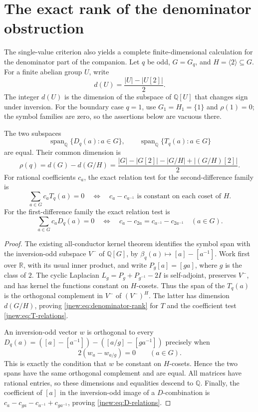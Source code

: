 \section{The exact rank of the denominator obstruction}
\label{jnew:sec:rank}

The single-value criterion also yields a complete finite-dimensional
calculation for the denominator part of the companion. Let $q$ be odd,
$G=G_q$, and $H=\langle2\rangle\subseteq G$. For a finite abelian
group $U$, write
\[
 d(U)=\frac{|U|-|U[2]|}{2}.
\]
The integer $d(U)$ is the dimension of the subspace of
$\mathbb Q[U]$ that changes sign under inversion.
For the boundary case $q=1$, use $G_1=H_1=\{1\}$ and $\rho(1)=0$;
the symbol families are zero, so the assertions below are vacuous there.

\begin{theorem}
\label{jnew:thm:denominator-rank}
The two subspaces
\[
 \operatorname{span}_{\mathbb Q}\{D_q(a):a\in G\},
 \qquad
 \operatorname{span}_{\mathbb Q}\{T_q(a):a\in G\}
\]
are equal. Their common dimension is
\begin{equation}\label{jnew:eq:denominator-rank}
 \boxed{\displaystyle\rho(q)=d(G)-d(G/H)
 =\frac{|G|-|G[2]|-|G/H|+|(G/H)[2]|}{2}.}
\end{equation}
For rational coefficients $c_a$, the exact relation test for the
second-difference family is
\begin{equation}\label{jnew:eq:T-relations}
 \sum_{a\in G}c_aT_q(a)=0
 \quad\Longleftrightarrow\quad
 c_a-c_{a^{-1}}\text{ is constant on each coset of }H.
\end{equation}
For the first-difference family the exact relation test is
\begin{equation}\label{jnew:eq:D-relations}
 \sum_{a\in G}c_aD_q(a)=0
 \quad\Longleftrightarrow\quad
 c_a-c_{2a}=c_{a^{-1}}-c_{2a^{-1}}\quad(a\in G).
\end{equation}
\end{theorem}
\begin{proof}
The existing all-conductor kernel theorem identifies the symbol span
with the inversion-odd subspace $V^-$ of $\mathbb Q[G]$, by
$\beta_q(a)\mapsto[a]-[a^{-1}]$. Work first over $\mathbb R$, with
its usual inner product, and write $P_g[a]=[ga]$, where $g$ is the
class of $2$. The cyclic Laplacian
$L_g=P_g+P_{g^{-1}}-2I$ is self-adjoint, preserves $V^-$, and has
kernel the functions constant on $H$-cosets. Thus the span of the
$T_q(a)$ is the orthogonal complement in $V^-$ of
$(V^-)^H$. The latter has dimension $d(G/H)$, proving
\eqref{jnew:eq:denominator-rank} for $T$ and the coefficient test
\eqref{jnew:eq:T-relations}.

An inversion-odd vector $w$ is orthogonal to every
$D_q(a)=([a]-[a^{-1}])-([a/g]-[ga^{-1}])$ precisely when
\[
 2(w_a-w_{a/g})=0\qquad(a\in G).
\]
This is exactly the condition that $w$ be constant on $H$-cosets.
Hence the two spans have the same orthogonal complement and are
equal. All matrices have rational entries, so these dimensions and
equalities descend to $\mathbb Q$. Finally, the coefficient of
$[a]$ in the inversion-odd image of a $D$-combination is
$c_a-c_{ga}-c_{a^{-1}}+c_{ga^{-1}}$, proving
\eqref{jnew:eq:D-relations}.
\end{proof}
